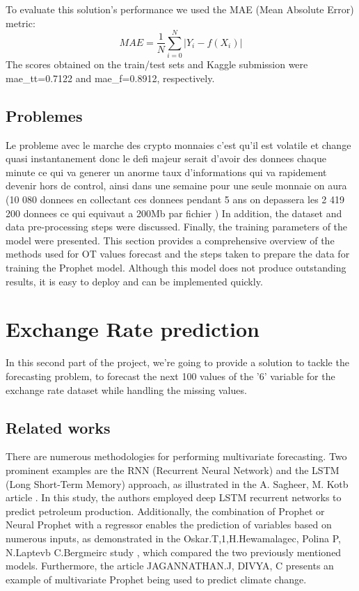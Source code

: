 \documentclass[10pt]{article}
\begin{document}
\begin{multicols}{2}
To evaluate this solution's performance we used the MAE (Mean Absolute Error)
metric:
$$MAE= \frac{1}{N} \sum_{i=0}^{N}  \left | Y_i-f(X_i) \right |$$
The scores obtained on the train/test sets and Kaggle submission were mae\_tt=0.7122 and mae\_f=0.8912, respectively.

\vspace{5pt}

\subsection{Problemes}
Le probleme avec le marche des crypto monnaies c'est qu'il est volatile et change quasi instantanement donc le defi majeur serait d'avoir des donnees chaque minute ce qui va generer un anorme taux d'informations qui va rapidement
devenir hors de control, ainsi dans une semaine pour une seule monnaie on aura (10 080 donnees en collectant ces donnees pendant 5 ans on depassera les 2 419 200 donnees ce
qui equivaut a 200Mb par fichier )
In addition, the dataset and data pre-processing steps were discussed. Finally, the training parameters of the model were presented.\newline
 This section provides a comprehensive overview of the methods used for OT values forecast and the steps taken to prepare the data for training the Prophet model.\newline
Although this model does not produce outstanding results, it is easy to deploy and can be implemented quickly.

\newpage
\section{Exchange Rate prediction}
In this second part of the project, we're going to provide a solution to tackle the forecasting problem, to forecast the next 100 values of the '6' variable for the exchange rate dataset while handling the missing values.

\subsection{Related works}
There are numerous methodologies for performing multivariate forecasting. Two prominent examples are the RNN (Recurrent Neural Network) and the LSTM (Long Short-Term Memory) approach, as illustrated in the A. Sagheer, M. Kotb article \cite{c8}. In this study, the authors employed deep LSTM recurrent networks to predict petroleum production. Additionally, the combination of Prophet or Neural Prophet with a regressor enables the prediction of variables based on numerous inputs, as demonstrated in the Oskar.T,1,H.Hewamalagec, Polina P, N.Laptevb C.Bergmeirc study \cite{c9}, which compared the two previously mentioned models. Furthermore, the article JAGANNATHAN.J, DIVYA, C \cite{c10} presents an example of multivariate Prophet being used to predict climate change.






\end{multicols}
\end{document}

